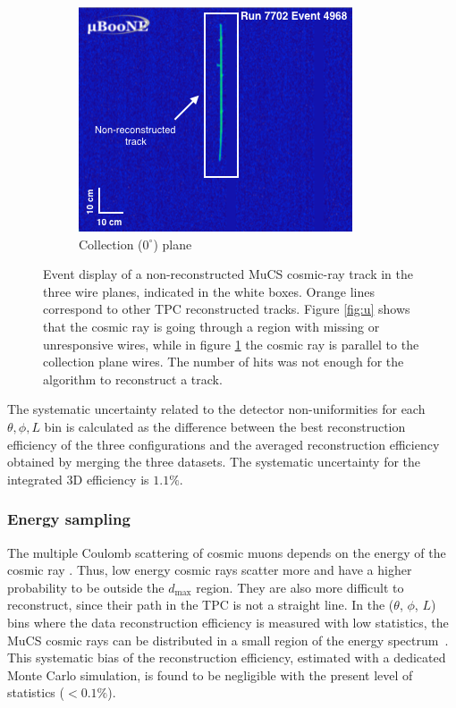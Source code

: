 \documentclass[a4paper,11pt]{article}
\begin{document}
\begin{figure}[htbp]
\begin{center}
    \begin{subfigure}{0.5\textwidth}
      \includegraphics[width=\linewidth]{figures/y.png}
      \caption{Collection ($0^{\circ}$) plane} \label{fig:y}
    \end{subfigure}    \caption{Event display of a non-reconstructed MuCS cosmic-ray track in the three wire planes, indicated in the white boxes. Orange lines correspond to other TPC reconstructed tracks. Figure \ref{fig:u} shows that the cosmic ray is going through a region with missing or unresponsive wires, while in figure \ref{fig:y} the cosmic ray is parallel to the collection plane wires. The number of hits was not enough for the algorithm to reconstruct a track.} \label{fig:example}
  \end{center}
\end{figure}

The systematic uncertainty related to the detector non-uniformities for each $\theta,\phi,L$ bin is calculated as the difference between the best reconstruction efficiency of the three configurations and the averaged reconstruction efficiency obtained by merging the three datasets.%
The systematic uncertainty for the integrated 3D efficiency is $1.1\%$.

\subsubsection{Energy sampling}
The multiple Coulomb scattering of cosmic muons depends on the energy of the cosmic ray \cite{pdg}. Thus, low energy cosmic rays scatter more and have a higher probability to be outside the $d_{\mathrm{max}}$ region. They are also more difficult to reconstruct, since their path in the TPC is not a straight line. In the ($\theta$, $\phi$, $L$) bins where the data reconstruction efficiency is measured with low statistics, the MuCS cosmic rays can be distributed in a small region of the energy spectrum~\cite{corsika}. This systematic bias of the reconstruction efficiency, estimated with a dedicated Monte Carlo simulation, is found to be negligible with the present level of statistics ($<0.1\%$).
\end{document}

